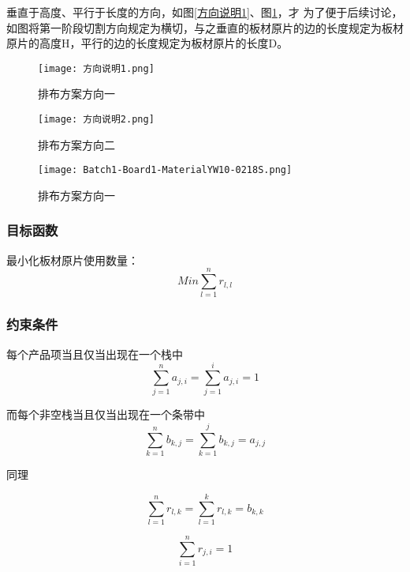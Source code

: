 \documentclass[bwprint]{gmcmthesis}
\begin{document}
垂直于高度、平行于长度的方向，如图\ref{方向说明1}、图\ref{方向说明2}，才
为了便于后续讨论，如图将第一阶段切割方向规定为横切，与之垂直的板材原片的边的长度规定为板材原片的高度H，平行的边的长度规定为板材原片的长度D。
\begin{figure}[!htbp]
    \centering
    \begin{minipage}{0.48\linewidth}
        \centering
        \texttt{[image: 方向说明1.png]}
        \caption{排布方案方向一}\label{方向说明1}
    \end{minipage}
    \begin{minipage}{0.48\linewidth}
        \centering
        \texttt{[image: 方向说明2.png]}
        \caption{排布方案方向二}\label{方向说明2}
    \end{minipage}
\end{figure}

\begin{figure}[!htbp]
        \centering
        \texttt{[image: Batch1-Board1-MaterialYW10-0218S.png]}
        \caption{排布方案方向一}
\end{figure}


\subsubsection{目标函数}
最小化板材原片使用数量：
\begin{equation}
    Min \sum_{l=1}^{n} r_{l,l} 
\end{equation}

\subsubsection{约束条件}
每个产品项当且仅当出现在一个栈中
\begin{equation}
    \sum_{j=1}^{n} a_{j,i}=\sum_{j=1}^{i} a_{j,i}=1
\end{equation}  

而每个非空栈当且仅当出现在一个条带中
\begin{equation}
    \sum_{k=1}^{n} b_{k,j}=\sum_{k=1}^{j} b_{k,j}=a_{j,j}
\end{equation}  

同理

\begin{equation}
    \sum_{l=1}^{n} r_{l,k}=\sum_{l=1}^{k} r_{l,k} =b_{k,k}
\end{equation}  

\begin{equation}
    \sum_{i=1}^{n} r_{j,i}=1
\end{equation}  
\end{document}
